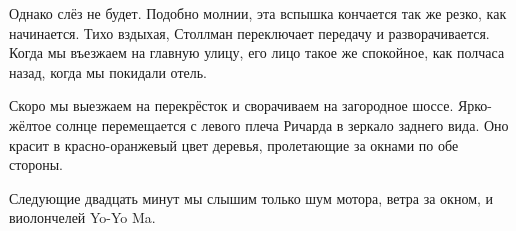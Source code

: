 Однако слёз не будет. Подобно молнии, эта вспышка кончается так же резко, как начинается. Тихо вздыхая, Столлман переключает передачу и разворачивается. Когда мы въезжаем на главную улицу, его лицо такое же спокойное, как полчаса назад, когда мы покидали отель.

Скоро мы выезжаем на перекрёсток и сворачиваем на загородное шоссе. Ярко-жёлтое солнце перемещается с левого плеча Ричарда в зеркало заднего вида. Оно красит в красно-оранжевый цвет деревья, пролетающие за окнами по обе стороны.

Следующие двадцать минут мы слышим только шум мотора, ветра за окном, и виолончелей Yo-Yo Ma.

\theendnotes
\setcounter{endnote}{0}
